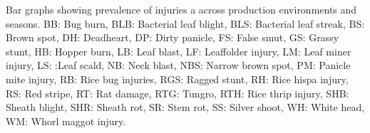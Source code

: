 Bar graphs showing  prevalence of injuries a across production environments and seasons. BB: Bug burn, BLB: Bacterial leaf blight, BLS: Bacterial leaf streak, BS: Brown spot, DH: Deadheart, DP: Dirty panicle, FS: False smut, GS: Grassy stunt, HB: Hopper burn, LB: Leaf blast, LF: Leaffolder injury, LM: Leaf miner injury, LS: :Leaf scald, NB: Neck blast, NBS:  Narrow brown spot, PM: Panicle mite injury, RB: Rice bug injuries, RGS: Ragged stunt, RH: Rice hispa injury, RS: Red stripe, RT: Rat damage, RTG: Tungro, RTH: Rice thrip injury, SHB: Sheath blight, SHR: Sheath rot, SR: Stem rot, SS: Silver shoot, WH: White head, WM: Whorl maggot injury.
\label{fig:barplot1}